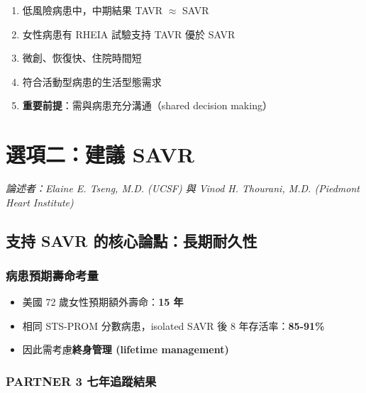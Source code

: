 \documentclass[12pt,a4paper]{article}
\begin{document}
\begin{tcolorbox}[colback=green!5!white, colframe=green!50!black, title=\textbf{支持 TAVR 的理由}]
\begin{enumerate}[leftmargin=*]
    \item 低風險病患中，中期結果 TAVR $\approx$ SAVR
    \item 女性病患有 RHEIA 試驗支持 TAVR 優於 SAVR
    \item 微創、恢復快、住院時間短
    \item 符合活動型病患的生活型態需求
    \item \textbf{重要前提}：需與病患充分溝通（shared decision making）
\end{enumerate}
\end{tcolorbox}

\section{選項二：建議 SAVR}

\textit{論述者：Elaine E. Tseng, M.D. (UCSF) 與 Vinod H. Thourani, M.D. (Piedmont Heart Institute)}

\subsection{支持 SAVR 的核心論點：長期耐久性}

\subsubsection{病患預期壽命考量}

\begin{itemize}[leftmargin=*]
    \item 美國 72 歲女性預期額外壽命：\textbf{15 年}
    \item 相同 STS-PROM 分數病患，isolated SAVR 後 8 年存活率：\textbf{85-91\%}
    \item 因此需考慮\textcolor{emergency_red}{\textbf{終身管理 (lifetime management)}}
\end{itemize}

\subsubsection{PARTNER 3 七年追蹤結果}
\end{document}

